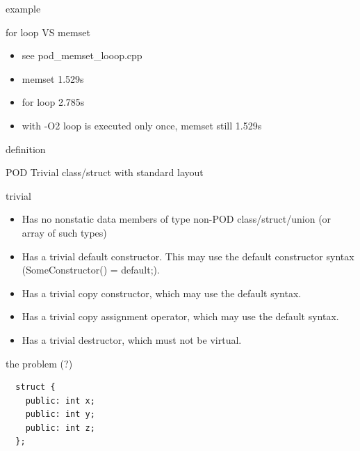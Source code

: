 \documentclass{beamer}
\begin{document}
\begin{frame}{example}
  \begin{block}{for loop VS memset}
    \begin{itemize}
    \item see pod\_memset\_looop.cpp
    \item memset 1.529s
    \item for loop 2.785s
    \item with -O2 loop is executed only once, memset still 1.529s
    \end{itemize}
  \end{block}
\end{frame}

\begin{frame}{definition}
  \begin{block}{POD}
    Trivial class/struct with standard layout
  \end{block}

  \begin{block}{trivial}
    \begin{itemize}
    \item Has no nonstatic data members of type non-POD class/struct/union (or array of such types)
    \item Has a trivial default constructor. This may use the default constructor syntax (SomeConstructor() = default;).
    \item Has a trivial copy constructor, which may use the default syntax.
    \item Has a trivial copy assignment operator, which may use the default syntax.
    \item Has a trivial destructor, which must not be virtual.
    \end{itemize}
  \end{block}
\end{frame}

\begin{frame}{the problem (?)}
  \begin{block}{}
\begin{verbatim}
  struct {
    public: int x;
    public: int y;
    public: int z;
  };

\end{verbatim}
  \end{block}
\end{frame}
\end{document}
